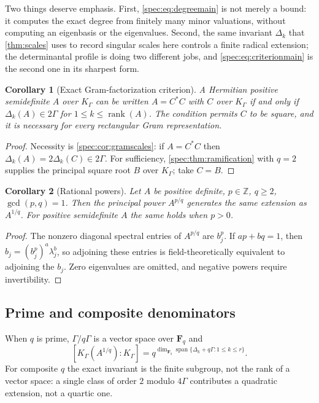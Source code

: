 \documentclass[11pt,a4paper]{article}
\numberwithin{equation}{section}
\newtheorem{corollary}[corollary]{Corollary}
\theoremstyle{definition}
\theoremstyle{remark}
\newcommand{\Z}{\mathbb Z}
\newcommand{\rank}{\operatorname{rank}}
\newcommand{\Span}{\operatorname{span}}
\begin{document}
Two things deserve emphasis. First, \eqref{spec:eq:degreemain} is not merely
a bound: it computes the exact degree from finitely many minor valuations,
without computing an eigenbasis or the eigenvalues. Second, the same
invariant $\Delta_k$ that \cref{thm:scales} uses to record singular scales
here controls a finite radical extension; the determinantal profile is doing
two different jobs, and \eqref{spec:eq:criterionmain} is the second one in
its sharpest form.

\begin{corollary}[Exact Gram-factorization criterion]\label{spec:cor:gramcriterion}
A Hermitian positive semidefinite $A$ over $K_\Gamma$ can be written
$A=C^*C$ with $C$ over $K_\Gamma$ if and only if
$\Delta_k(A)\in2\Gamma$ for $1\le k\le\rank(A)$. The condition permits $C$
to be square, and it is necessary for every rectangular Gram
representation.
\end{corollary}
\begin{proof}
Necessity is \cref{spec:cor:gramscales}: if $A=C^*C$ then
$\Delta_k(A)=2\Delta_k(C)\in2\Gamma$. For sufficiency,
\cref{spec:thm:ramification} with $q=2$ supplies the principal square root
$B$ over $K_\Gamma$; take $C=B$.
\end{proof}

\begin{corollary}[Rational powers]\label{spec:cor:rationalpower}
Let $A$ be positive definite, $p\in\Z$, $q\ge2$, $\gcd(p,q)=1$. Then the
principal power $A^{p/q}$ generates the same extension as $A^{1/q}$. For
positive semidefinite $A$ the same holds when $p>0$.
\end{corollary}
\begin{proof}
The nonzero diagonal spectral entries of $A^{p/q}$ are $b_j^p$. If
$ap+bq=1$, then $b_j=(b_j^p)^a\lambda_j^b$, so adjoining these entries is
field-theoretically equivalent to adjoining the $b_j$. Zero eigenvalues are
omitted, and negative powers require invertibility.
\end{proof}

\subsection{Prime and composite denominators}

When $q$ is prime, $\Gamma/q\Gamma$ is a vector space over $\mathbf F_q$ and
\[
 [K_\Gamma(A^{1/q}):K_\Gamma]
 =q^{\dim_{\mathbf F_q}\Span\{\Delta_k+q\Gamma:1\le k\le r\}}.
\]
For composite $q$ the exact invariant is the finite subgroup, not the rank
of a vector space: a single class of order $2$ modulo $4\Gamma$ contributes
a quadratic extension, not a quartic one.
\end{document}
